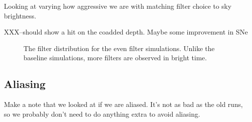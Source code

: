 Looking at varying how aggressive we are with matching filter choice to sky brightness.  

XXX--should show a hit on the coadded depth. Maybe some improvement in SNe

\begin{figure}
\caption{The filter distribution for the even filter simulations. Unlike the baseline simulations, more filters are observed in bright time.}\label{fig:even_filt_hourglass}
\end{figure}

\subsection{Aliasing}

Make a note that we looked at if we are aliased. It's not as bad as the old runs, so we probably don't need to do anything extra to avoid aliasing.

